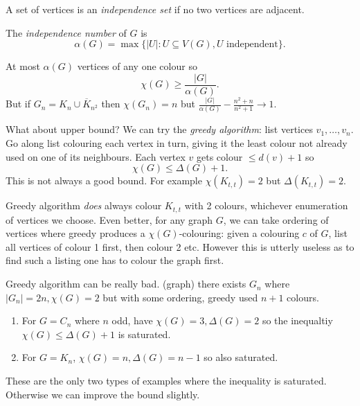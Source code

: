 \documentclass[a4paper]{article}
\begin{document}
\begin{definition}
  A set of vertices is an \emph{independence set} if no two vertices are adjacent.

  The \emph{independence number} of \(G\) is
  \[
    \alpha(G) = \max \{|U|: U \subseteq V(G), U \text{ independent}\}.
  \]
\end{definition}

At most \(\alpha(G)\) vertices of any one colour so
\[
  \chi(G) \geq \frac{|G|}{\alpha(G)}.
\]
But if \(G_n = K_n \cup \overline K_{n^2}\) then \(\chi(G_n) = n\) but \(\frac{|G|}{\alpha(G)} - \frac{n^2 + n}{n^2 + 1} \to 1\).

What about upper bound? We can try the \emph{greedy algorithm}: list vertices \(v_1, \dots, v_n\). Go along list colouring each vertex in turn, giving it the least colour not already used on one of its neighbours. Each vertex \(v\) gets colour \(\leq d(v) + 1\) so
\[
  \chi(G) \leq \Delta(G) + 1.
\]
This is not always a good bound. For example \(\chi(K_{t, t}) = 2\) but \(\Delta(K_{t, t}) = 2\).

\begin{remark}
  Greedy algorithm \emph{does} always colour \(K_{t, t}\) with 2 colours, whichever enumeration of vertices we choose. Even better, for any graph \(G\), we can take ordering of vertices where greedy produces a \(\chi(G)\)-colouring: given a colouring \(c\) of \(G\), list all vertices of colour 1 first, then colour 2 etc. However this is utterly useless as to find such a listing one has to colour the graph first.
\end{remark}

Greedy algorithm can be really bad. (graph) there exists \(G_n\) where \(|G_n| = 2n, \chi(G) = 2\) but with some ordering, greedy used \(n + 1\) colours.

\begin{eg}\leavevmode
  \begin{enumerate}
  \item For \(G = C_n\) where \(n\) odd, have \(\chi(G) = 3, \Delta(G) = 2\) so the inequaltiy \(\chi(G) \leq \Delta(G) + 1\) is saturated.
  \item For \(G = K_n\), \(\chi(G) = n, \Delta(G) = n - 1\) so also saturated.
  \end{enumerate}
\end{eg}

These are the only two types of examples where the inequality is saturated. Otherwise we can improve the bound slightly.
\end{document}
